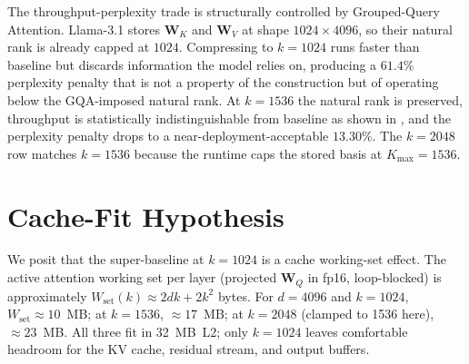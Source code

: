 \documentclass[11pt]{article}
\providecommand{\Wmat}{\mathbf{W}}
\begin{document}
The throughput-perplexity trade is structurally controlled by Grouped-Query
Attention. Llama-3.1 stores $\Wmat_K$ and $\Wmat_V$ at shape $1024\times4096$,
so their natural rank is already capped at $1024$. Compressing to $k{=}1024$
runs faster than baseline but discards information the model relies on,
producing a $61.4\%$ perplexity penalty that is not a property of the
construction but of operating below the GQA-imposed natural rank. At
$k{=}1536$ the natural rank is preserved, throughput is statistically
indistinguishable from baseline as shown in , and the
perplexity penalty drops to a near-deployment-acceptable $13.30\%$. The
$k{=}2048$ row matches $k{=}1536$ because the runtime caps the stored basis
at $K_\text{max}{=}1536$.

\section{Cache-Fit Hypothesis}
\label{sec:cachefit}
We posit that the super-baseline at $k{=}1024$ is a cache working-set effect.
The active attention working set per layer (projected $\Wmat_Q$ in fp16,
loop-blocked) is approximately $W_\text{set}(k) \approx 2 d k\!+\!2 k^2$ bytes.
For $d{=}4096$ and $k{=}1024$, $W_\text{set}\!\approx\!10$~MB; at $k{=}1536$,
$\approx\!17$~MB; at $k{=}2048$ (clamped to 1536 here), $\approx\!23$~MB.  All
three fit in 32~MB~L2; only $k{=}1024$ leaves comfortable headroom for the KV
cache, residual stream, and output buffers.
\end{document}
